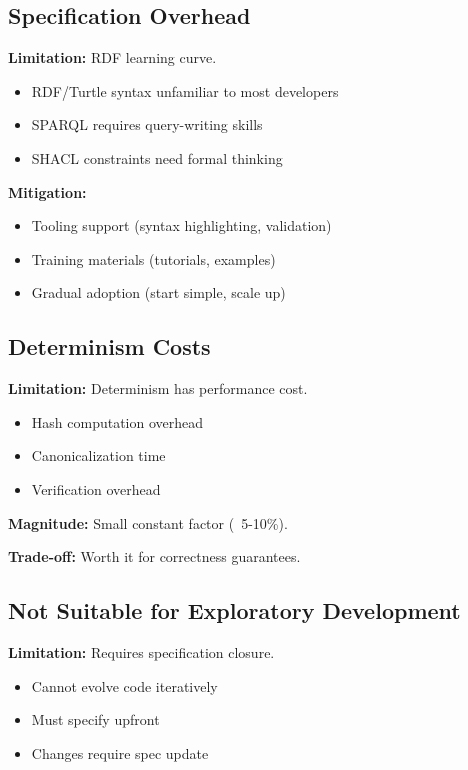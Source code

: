 \subsection{Specification Overhead}

\textbf{Limitation:} RDF learning curve.

\begin{itemize}
    \item RDF/Turtle syntax unfamiliar to most developers
    \item SPARQL requires query-writing skills
    \item SHACL constraints need formal thinking
\end{itemize}

\textbf{Mitigation:}
\begin{itemize}
    \item Tooling support (syntax highlighting, validation)
    \item Training materials (tutorials, examples)
    \item Gradual adoption (start simple, scale up)
\end{itemize}

\subsection{Determinism Costs}

\textbf{Limitation:} Determinism has performance cost.

\begin{itemize}
    \item Hash computation overhead
    \item Canonicalization time
    \item Verification overhead
\end{itemize}

\textbf{Magnitude:} Small constant factor (~5-10\%).

\textbf{Trade-off:} Worth it for correctness guarantees.

\subsection{Not Suitable for Exploratory Development}

\textbf{Limitation:} Requires specification closure.

\begin{itemize}
    \item Cannot evolve code iteratively
    \item Must specify upfront
    \item Changes require spec update
\end{itemize}

